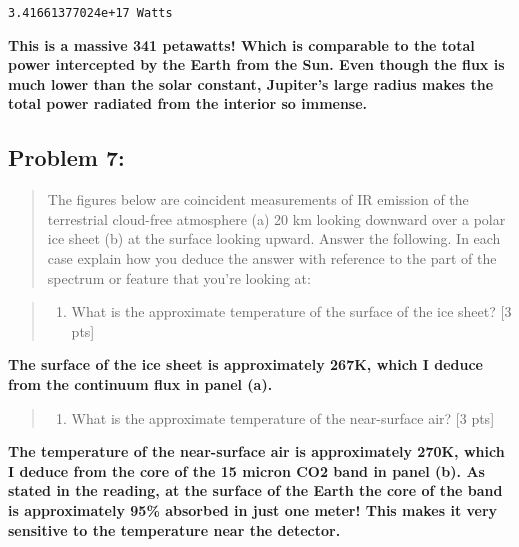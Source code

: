 \documentclass[11pt]{article}
\providecommand{\tightlist}{%
      \setlength{\itemsep}{0pt}\setlength{\parskip}{0pt}}
\begin{document}
    \begin{Verbatim}[commandchars=\\\{\}]
3.41661377024e+17 Watts

    \end{Verbatim}

    \textbf{This is a massive 341 petawatts! Which is comparable to the
total power intercepted by the Earth from the Sun. Even though the flux
is much lower than the solar constant, Jupiter's large radius makes the
total power radiated from the interior so immense.}

    \subsection{Problem 7:}\label{problem-7}

\begin{quote}
The figures below are coincident measurements of IR emission of the
terrestrial cloud-free atmosphere (a) 20 km looking downward over a
polar ice sheet (b) at the surface looking upward. Answer the following.
In each case explain how you deduce the answer with reference to the
part of the spectrum or feature that you're looking at:
\end{quote}

\begin{quote}
\begin{enumerate}
\def\labelenumi{(\alph{enumi})}
\tightlist
\item
  What is the approximate temperature of the surface of the ice sheet?
  {[}3 pts{]}
\end{enumerate}
\end{quote}

\textbf{The surface of the ice sheet is approximately 267K, which I
deduce from the continuum flux in panel (a).}

\begin{quote}
\begin{enumerate}
\def\labelenumi{(\alph{enumi})}
\setcounter{enumi}{1}
\tightlist
\item
  What is the approximate temperature of the near-surface air? {[}3
  pts{]}
\end{enumerate}
\end{quote}

\textbf{The temperature of the near-surface air is approximately 270K,
which I deduce from the core of the 15 micron CO2 band in panel (b). As
stated in the reading, at the surface of the Earth the core of the band
is approximately 95\% absorbed in just one meter! This makes it very
sensitive to the temperature near the detector.}
\end{document}
